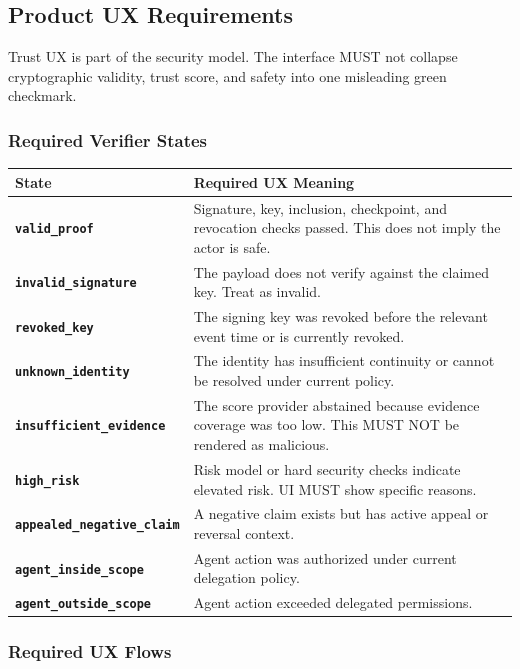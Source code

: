 \documentclass[11pt]{article}
\begin{document}
\subsection{Product UX Requirements}

Trust UX is part of the security model. The interface MUST not collapse cryptographic validity, trust score, and safety into one misleading green checkmark.

\subsubsection{Required Verifier States}

\begin{center}
\begin{tabularx}{\textwidth}{>{\bfseries}p{} X}
\toprule
State & Required UX Meaning \\
\midrule
\texttt{valid\_proof} & Signature, key, inclusion, checkpoint, and revocation checks passed. This does not imply the actor is safe. \\
\texttt{invalid\_signature} & The payload does not verify against the claimed key. Treat as invalid. \\
\texttt{revoked\_key} & The signing key was revoked before the relevant event time or is currently revoked. \\
\texttt{unknown\_identity} & The identity has insufficient continuity or cannot be resolved under current policy. \\
\texttt{insufficient\_evidence} & The score provider abstained because evidence coverage was too low. This MUST NOT be rendered as malicious. \\
\texttt{high\_risk} & Risk model or hard security checks indicate elevated risk. UI MUST show specific reasons. \\
\texttt{appealed\_negative\_claim} & A negative claim exists but has active appeal or reversal context. \\
\texttt{agent\_inside\_scope} & Agent action was authorized under current delegation policy. \\
\texttt{agent\_outside\_scope} & Agent action exceeded delegated permissions. \\
\bottomrule
\end{tabularx}
\end{center}

\subsubsection{Required UX Flows}
\end{document}
